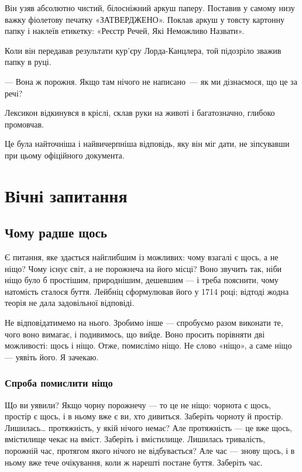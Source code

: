 \documentclass[12pt, a4paper, openany]{book}
\begin{document}
\begin{terrybox}
Він узяв абсолютно чистий, білосніжний аркуш паперу. Поставив у самому низу важку фіолетову печатку «ЗАТВЕРДЖЕНО». Поклав аркуш у товсту картонну папку і наклеїв етикетку: «Реєстр Речей, Які Неможливо Назвати».

Коли він передавав результати кур'єру Лорда-Канцлера, той підозріло зважив папку в руці.

--- Вона ж порожня. Якщо там нічого не написано~--- як ми дізнаємося, що це за речі?

Лексикон відкинувся в кріслі, склав руки на животі і багатозначно, глибоко промовчав.

Це була найточніша і найвичерпніша відповідь, яку він міг дати, не зіпсувавши при цьому офіційного документа.
\end{terrybox}

\chapter{Вічні запитання}

\section{Чому радше щось}

Є питання, яке здається найглибшим із можливих: чому взагалі є щось, а не ніщо? Чому існує світ, а не порожнеча на його місці? Воно звучить так, ніби ніщо було б простішим, природнішим, дешевшим --- і треба пояснити, чому натомість сталося буття. Лейбніц сформулював його у 1714 році; відтоді жодна теорія не дала задовільної відповіді.

Не відповідатимемо на нього. Зробимо інше --- спробуємо разом виконати те, чого воно вимагає, і подивимось, що вийде. Воно просить порівняти дві можливості: щось і ніщо. Отже, помислімо ніщо. Не слово «ніщо», а саме ніщо --- уявіть його. Я зачекаю.

\subsection{Спроба помислити ніщо}

Що ви уявили? Якщо чорну порожнечу --- то це не ніщо: чорнота є щось, простір є щось, і в ньому вже є ви, хто дивиться. Заберіть чорноту й простір. Лишилась\ldots{} протяжність, у якій нічого немає? Але протяжність --- це вже щось, вмістилище чекає на вміст. Заберіть і вмістилище. Лишилась тривалість, порожній час, протягом якого нічого не відбувається? Але час --- знову щось, і в ньому вже тече очікування, коли ж нарешті постане буття. Заберіть час.
\end{document}
